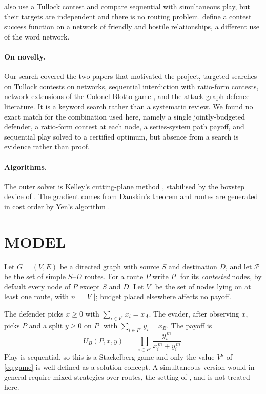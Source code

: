 \documentclass[10pt,a4paper,twoside]{article}
\theoremstyle{plain}
\theoremstyle{definition}
\newcommand{\XA}{\bar{x}_A}
\newcommand{\XB}{\bar{x}_B}
\newcommand{\Path}{\mathcal{P}}
\begin{document}
\citet{iliaev2023} also use a Tullock contest and compare sequential with
simultaneous play, but their targets are independent and there is no routing
problem. \citet{bozbay2018} define a contest success function on a network of
friendly and hostile relationships, a different use of the word network.

\paragraph{On novelty.}
Our search covered the two papers that motivated the project, targeted
searches on Tullock contests on networks, sequential interdiction with
ratio-form contests, network extensions of the Colonel Blotto game
\citep{kovenock2018}, and the attack-graph defence literature. It is a
keyword search rather than a systematic review. We found no exact match for
the combination used here, namely a single jointly-budgeted defender, a
ratio-form contest at each node, a series-system path payoff, and sequential
play solved to a certified optimum, but absence from a search is evidence
rather than proof.

\paragraph{Algorithms.}
The outer solver is Kelley's cutting-plane method \citep{kelley1960},
stabilised by the boxstep device of \citet{marsten1975}. The gradient comes
from Danskin's theorem \citep{danskin1967} and routes are generated in cost
order by Yen's algorithm \citep{yen1971}.

\section{MODEL}
\label{sec:model}

Let $G=(V,E)$ be a directed graph with source $S$ and destination $D$, and
let $\Path$ be the set of simple $S$--$D$ routes. For a route $P$ write
$P^{\circ}$ for its \emph{contested} nodes, by default every node of $P$
except $S$ and $D$. Let $V^{\circ}$ be the set of nodes lying on at least one
route, with $n=|V^{\circ}|$; budget placed elsewhere affects no payoff.

The defender picks $x\ge0$ with $\sum_{i\in V^{\circ}}x_i=\XA$. The evader,
after observing $x$, picks $P$ and a split $y\ge0$ on $P^{\circ}$ with
$\sum_{i\in P^{\circ}}y_i=\XB$. The payoff is
\begin{equation}
  U_B(P,x,y)\;=\;\prod_{i\in P^{\circ}}
  \frac{y_i^{\,m}}{x_i^{\,m}+y_i^{\,m}}.
  \label{eq:payoff}
\end{equation}
Play is sequential, so this is a Stackelberg game and only the value
$V^{\star}$ of \eqref{eq:game} is well defined as a solution concept. A
simultaneous version would in general require mixed strategies over routes,
the setting of \citet{nguyen2023}, and is not treated here.
\end{document}
